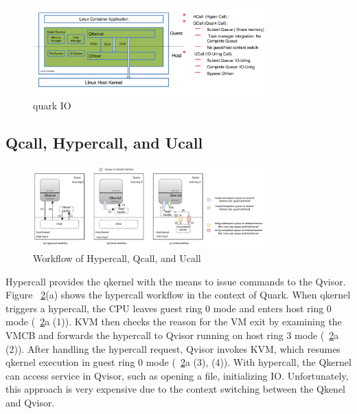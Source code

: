\begin{figure}[H]
    \centering
    \includegraphics[width=0.8\textwidth]{images/quark_io.png}
    \caption[quark IO]{quark IO}
    \label{fig:quark_io}
\end{figure}


\subsection{Qcall, Hypercall, and Ucall}
\begin{figure}[H]
  \centering
  \includegraphics[width=0.8\textwidth]{images/hypercall_qcall_ucall.pdf}
  \caption[Workflow of Hypercall, Qcall, and Ucall]{Workflow of Hypercall, Qcall, and Ucall}
  \label{fig:hypercall_qcall_ucall}
\end{figure}
Hypercall provides the qkernel with the means to issue commands to the Qvisor. Figure ~\ref{fig:hypercall_qcall_ucall}(a) shows the hypercall workflow in the context of Quark. 
When qkernel triggers a hypercall, the CPU leaves guest ring 0 mode and enters host ring 0 mode (~\ref{fig:hypercall_qcall_ucall}a (1)). KVM then checks the reason for the VM exit by examining the VMCB and forwards the 
hypercall to Qvisor running on host ring 3 mode (~\ref{fig:hypercall_qcall_ucall}a (2)). After handling the hypercall request, Qvisor invokes KVM, which resumes qkernel execution in guest ring 0 mode (~\ref{fig:hypercall_qcall_ucall}a (3), (4)).
With hypercall, the Qkernel can access service in Qvisor, such as opening a file, initializing IO. Unfortunately, 
this approach is very expensive due to the context switching between the Qkenel and Qvisor. 

